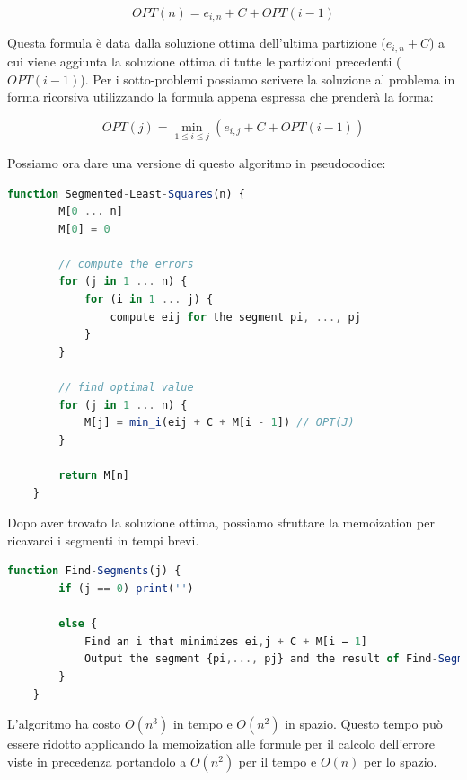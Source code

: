 \[
    OPT(n) = e_{i,n} + C + OPT(i - 1)
\]

Questa formula è data dalla soluzione ottima dell'ultima partizione ($e_{i,n} + C$)
a cui viene aggiunta la soluzione ottima di tutte le partizioni precedenti
($OPT(i -1)$). Per i sotto-problemi possiamo scrivere la soluzione al problema
in forma ricorsiva utilizzando la formula appena espressa che prenderà la forma:

\[
    OPT(j) = \min_{1 \leq i \leq j}(e_{i,j} + C + OPT(i - 1))
\]

Possiamo ora dare una versione di questo algoritmo in pseudocodice:

\begin{lstlisting}[language=Javascript]
    function Segmented-Least-Squares(n) {
        M[0 ... n]
        M[0] = 0

        // compute the errors
        for (j in 1 ... n) {
            for (i in 1 ... j) {
                compute eij for the segment pi, ..., pj
            }
        }

        // find optimal value
        for (j in 1 ... n) {
            M[j] = min_i(eij + C + M[i - 1]) // OPT(J)
        }

        return M[n]
    }
\end{lstlisting}

Dopo aver trovato la soluzione ottima, possiamo sfruttare la memoization per
ricavarci i segmenti in tempi brevi.

\begin{lstlisting}[language=Javascript]
    function Find-Segments(j) {
        if (j == 0) print('')

        else {
            Find an i that minimizes ei,j + C + M[i − 1]
            Output the segment {pi,..., pj} and the result of Find-Segments(i − 1)
        }
    }
\end{lstlisting}

L'algoritmo ha costo $O(n^3)$ in tempo e $O(n^2)$ in spazio.
Questo tempo può essere ridotto applicando la memoization alle formule per il calcolo
dell'errore viste in precedenza portandolo a $O(n^2)$ per il tempo e $O(n)$ per lo spazio.